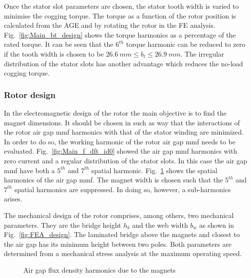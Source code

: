 Once the stator slot parameters are chosen, the stator tooth width is varied to minimise the cogging torque. The torque as a function of the rotor position is calculated from the AGE and by rotating the rotor in the FE analysis. Fig.~\ref{fig:Main_bt_design} shows the torque harmonics as a percentage of the rated torque. It can be seen that the $6^{th}$ torque harmonic can be reduced to zero if the tooth width is chosen to be $\SI{26.6}{mm} \leq b_t \leq \SI{26.9}{mm}$. The irregular distribution of the stator slots has another advantage which reduces the no-load cogging torque.

\subsubsection{Rotor design}
In the electromagnetic design of the rotor the main objective is to find the magnet dimensions. It should be chosen in such as way that the interactions of the rotor air gap mmf harmonics with that of the stator winding are minimized. In order to do so, the working harmonic of the rotor air gap mmf needs to be evaluated. Fig.~\ref{fig:Main_f_dft_id0} showed the air gap mmf harmonics with zero current and a regular distribution of the stator slots. In this case the air gap mmf have both a $5^{th}$ and $7^{th}$ spatial harmonic. Fig.~\ref{fig:mag_entwurf} shows the spatial harmonics of the air gap mmf. The magnet width is chosen such that the $5^{th}$ and $7^{th}$ spatial harmonics are suppressed. In doing so, however, a sub-harmonics arises.

The mechanical design of the rotor comprises, among others, two mechanical parameters. They are the bridge height $h_b$ and the web width $b_w$ as shown in Fig.~\ref{fig:FEA_design}. The laminated bridge above the magnets and closest to the air gap has its minimum height between two poles. Both parameters are determined from a mechanical stress analysis at the maximum operating speed.      

\begin{figure}[htbp]
	\centering
		
	\caption{Air gap flux density harmonics due to the magnets}
	\label{fig:mag_entwurf}
\end{figure}

